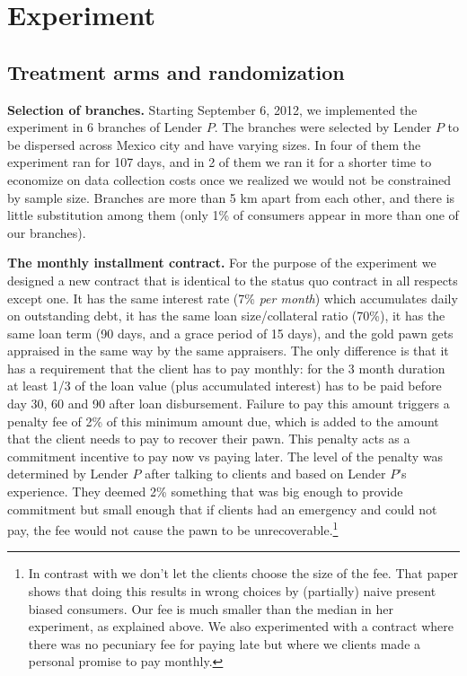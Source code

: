 \documentclass[oneside,11pt]{article}
\begin{document}
\section{Experiment} \label{Experiment}

\subsection{Treatment arms and randomization}

\noindent \textbf{Selection of branches.} Starting September 6, 2012, we implemented the experiment in 6 branches of Lender $P$. The branches were selected by Lender $P$ to be dispersed across Mexico city and have varying sizes. In four of them the experiment ran for 107 days, and in 2 of them we ran it for a shorter time to economize on data collection costs once we realized we would not be constrained by sample size. %
Branches are more than 5 km apart from each other, and there is little substitution among them (only 1\% of consumers appear in more than one of our branches).

\vspace{.2in}
\noindent \textbf{The monthly installment contract.} For the purpose of the experiment we designed a new contract that is identical to the status quo contract in all respects except one. It has the same interest rate (7\% \textit{per month}) which accumulates daily on outstanding debt, it has the same loan size/collateral ratio (70\%), it has the same loan term (90 days, and a grace period of 15 days), and the gold pawn gets appraised in the same way by the same appraisers. The only difference is that it has a requirement that the client has to pay monthly: for the 3 month duration at least 1/3 of the loan value (plus accumulated interest) has to be paid before day 30, 60 and 90 after loan disbursement. Failure to pay this amount triggers a penalty fee of 2\% of this minimum amount due, which is added to the amount that the client needs to pay to recover their pawn. This penalty acts as a commitment incentive to pay now vs paying later. The level of the penalty was determined by Lender $P$ after talking to clients and based on Lender $P$'s experience. They deemed 2\% something that was big enough to provide commitment but small enough that if clients had an emergency and could not pay, the fee would not cause the pawn to be unrecoverable.\footnote{In contrast with \cite{John} we don't let the clients choose the size of the fee. That paper shows that doing this results in wrong choices by (partially) naive present biased consumers. Our fee is much smaller than the median in her experiment, as explained above. We also experimented with a contract where there was no pecuniary fee for paying late but where we clients made a personal promise to pay monthly.}
\end{document}
